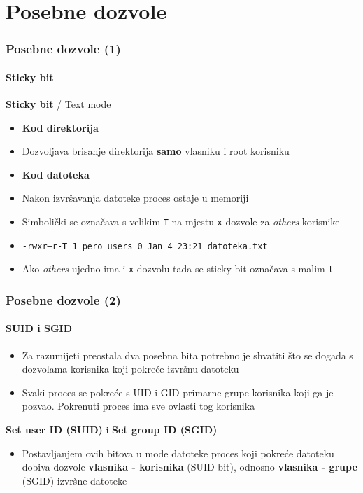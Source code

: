 \documentclass[table,usenames,dvipsnames]{beamer}
\newcommand{\shell}[1]{\texttt{#1}}
\begin{document}
\section{Posebne dozvole}
\begin{frame}[t]
	\frametitle{Posebne dozvole (1)}
	\framesubtitle{Sticky bit}
\textbf{Sticky bit} / Text mode
\begin{itemize}
	\item \textbf{Kod direktorija}
	\item[] Dozvoljava brisanje direktorija \textbf{samo} vlasniku i root korisniku
	\item \textbf{Kod datoteka}
	\item[] Nakon izvršavanja datoteke proces ostaje u memoriji
\end{itemize}
\begin{itemize}
	\item Simbolički se označava s velikim \shell{T} na mjestu \shell{x} dozvole za \textit{others} korisnike
	\item[] {\footnotesize \shell{-rwxr--r-T 1 pero users 0 Jan  4 23:21 datoteka.txt} }
	\item Ako \textit{others} ujedno ima i \shell{x} dozvolu tada se sticky bit označava s malim \shell{t}
\end{itemize}
\end{frame}

\begin{frame}[t]
	\frametitle{Posebne dozvole (2)}
	\framesubtitle{SUID i SGID}
\begin{itemize}
	\item Za razumijeti preostala dva posebna bita potrebno je shvatiti što se događa s dozvolama korisnika koji pokreće izvršnu datoteku
	\item Svaki proces se pokreće s UID i GID primarne grupe korisnika koji ga je pozvao. Pokrenuti proces ima sve ovlasti tog korisnika
\end{itemize}
\vfill
\textbf{Set user ID (SUID)} i \textbf{Set group ID (SGID)}
\begin{itemize}
	\item Postavljanjem ovih bitova u mode datoteke proces koji pokreće datoteku dobiva dozvole \textbf{vlasnika - korisnika} (SUID bit), odnosno \textbf{vlasnika - grupe} (SGID) izvršne datoteke
\end{itemize}
\end{frame}
\end{document}
